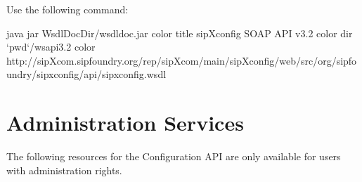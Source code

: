 \documentclass[letterpaper,10pt,english]{sphinxmanual}
\begin{document}
 Use the following command:

\begin{sphinxVerbatim}[commandchars=\\\{\}]
java \PYGZhy{}jar \PYGZdl{}WsdlDocDir/wsdldoc.jar \PYGZob{}color\PYGZcb{}
\PYGZhy{}title \PYGZdq{}sipXconfig SOAP API v3.2\PYGZdq{} \PYGZob{}color\PYGZcb{}
\PYGZhy{}dir {}`pwd{}`\PYGZdq{}/ws\PYGZhy{}api\PYGZhy{}3.2\PYGZdq{} \PYGZob{}color\PYGZcb{}
http://sipXcom.sipfoundry.org/rep/sipXcom/main/sipXconfig/web/src/org/sipfoundry/sipxconfig/api/sipxconfig.wsdl
\end{sphinxVerbatim}


\section{Administration Services}
\label{\detokenize{soapapi:administration-services}}
The following resources for the Configuration API are only available for users with administration rights.
\end{document}
